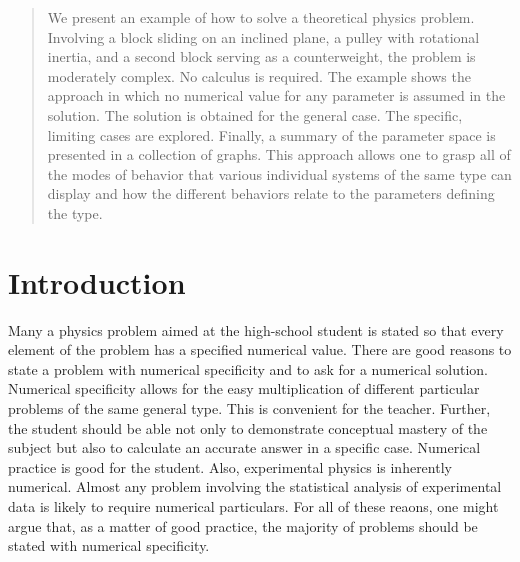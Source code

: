 \documentclass[twocolumn]{article}
\begin{document}
\thispagestyle{fancy}

\begin{abstract}

   We present an example of how to solve a theoretical physics problem.
   Involving a block sliding on an inclined plane, a pulley with rotational
   inertia, and a second block serving as a counterweight, the problem is
   moderately complex.  No calculus is required.  The example shows the
   approach in which no numerical value for any parameter is assumed in the
   solution.  The solution is obtained for the general case.  The specific,
   limiting cases are explored.  Finally, a summary of the parameter space is
   presented in a collection of graphs.  This approach allows one to grasp all
   of the modes of behavior that various individual systems of the same type
   can display and how the different behaviors relate to the parameters
   defining the type.

\end{abstract}

\section{Introduction}

Many a physics problem aimed at the high-school student is stated so that every
element of the problem has a specified numerical value.  There are good reasons
to state a problem with numerical specificity and to ask for a numerical
solution.  Numerical specificity allows for the easy multiplication of
different particular problems of the same general type.  This is convenient for
the teacher.  Further, the student should be able not only to demonstrate
conceptual mastery of the subject but also to calculate an accurate answer in a
specific case.  Numerical practice is good for the student.  Also, experimental
physics is inherently numerical. Almost any problem involving the statistical
analysis of experimental data is likely to require numerical particulars. For
all of these reaons, one might argue that, as a matter of good practice, the
majority of problems should be stated with numerical specificity.
\end{document}
